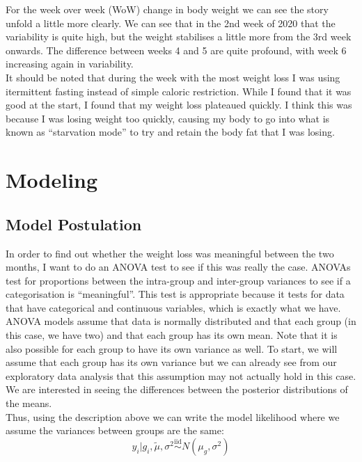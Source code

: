 \documentclass[journal, a4paper]{IEEEtran}
\begin{document}
For the week over week (WoW) change in body weight we can see the story unfold a little more clearly. We can see that in the 2nd week of 2020 that the 
variability is quite high, but the weight stabilises a little more from the 3rd week onwards. The difference between weeks 4 and 5 are quite profound, with week
6 increasing again in variability.\\

It should be noted that during the week with the most weight loss I was using itermittent fasting instead of simple caloric restriction. While I found that it 
was good at the start, I found that my weight loss plateaued quickly. I think this was because I was losing weight too quickly, causing my body to go into what
is known as ``starvation mode'' to try and retain the body fat that I was losing.

\section{Modeling}

\subsection{Model Postulation}

In order to find out whether the weight loss was meaningful between the two months, I want to do an ANOVA test to see if this was really the case. ANOVAs test
for proportions between the intra-group and inter-group variances to see if a categorisation is ``meaningful''. This test is appropriate because it tests for
data that have categorical and continuous variables, which is exactly what we have.\\

ANOVA models assume that data is normally distributed and that each group (in this case, we have two) and that each group has its own mean. Note that it is also
possible for each group to have its own variance as well. To start, we will assume that each group has its own variance but we can already see from our 
exploratory data analysis that this assumption may not actually hold in this case. We are interested in seeing the differences between the posterior
distributions of the means.\\

Thus, using the description above we can write the model likelihood where we assume the variances between groups are the same:\\

$$y_i | g_i,  \tilde\mu, \sigma^2 \overset{\text{iid}}{\sim} N(\mu_g, \sigma^2)$$
\end{document}
